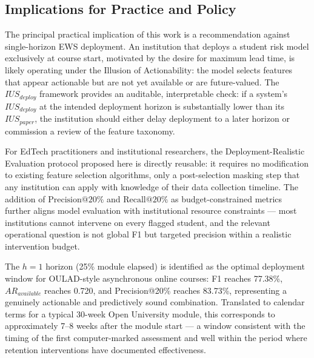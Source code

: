 \documentclass[a4paper,fleqn]{cas-sc}
\begin{document}
\subsection{Implications for Practice and Policy}

The principal practical implication of this work is a recommendation against single-horizon EWS deployment. An institution that deploys a student risk model exclusively at course start, motivated by the desire for maximum lead time, is likely operating under the Illusion of Actionability: the model selects features that appear actionable but are not yet available or are future-valued. The $IUS_{deploy}$ framework provides an auditable, interpretable check: if a system's $IUS_{deploy}$ at the intended deployment horizon is substantially lower than its $IUS_{paper}$, the institution should either delay deployment to a later horizon or commission a review of the feature taxonomy.

For EdTech practitioners and institutional researchers, the Deployment-Realistic Evaluation protocol proposed here is directly reusable: it requires no modification to existing feature selection algorithms, only a post-selection masking step that any institution can apply with knowledge of their data collection timeline. The addition of $\text{Precision}@20\%$ and $\text{Recall}@20\%$ as budget-constrained metrics further aligns model evaluation with institutional resource constraints --- most institutions cannot intervene on every flagged student, and the relevant operational question is not global F1 but targeted precision within a realistic intervention budget.

The $h=1$ horizon (25\% module elapsed) is identified as the optimal deployment window for OULAD-style asynchronous online courses: F1 reaches 77.38\%, $AR_{available}$ reaches 0.720, and Precision@20\% reaches 83.73\%, representing a genuinely actionable and predictively sound combination. Translated to calendar terms for a typical 30-week Open University module, this corresponds to approximately 7--8 weeks after the module start --- a window consistent with the timing of the first computer-marked assessment and well within the period where retention interventions have documented effectiveness.
\printcredits

%





\end{document}

